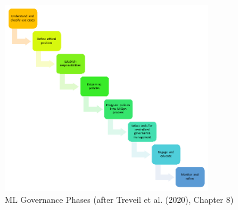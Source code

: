 \begin{figure}
\centering
\includegraphics[height=3.25in]{governancegraphics.png}
\caption[ML Governance Phases]{ML Governance Phases (after Treveil et al. (2020), Chapter 8)}
\label{fig:mlgovernance}
\end{figure}

